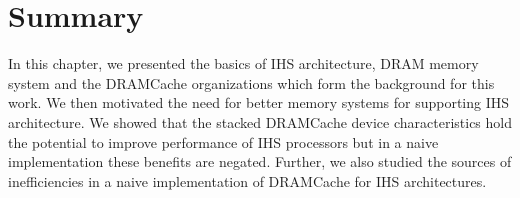 \section{Summary}
In this chapter, we presented the basics of IHS architecture, DRAM memory system and the DRAMCache organizations which form the background for this work. We then motivated the need for better memory systems for supporting IHS architecture. We showed that the stacked DRAMCache device characteristics hold the potential to improve performance of IHS processors but in a naive implementation these benefits are negated. Further, we also studied the sources of inefficiencies in a naive implementation of DRAMCache for IHS architectures.